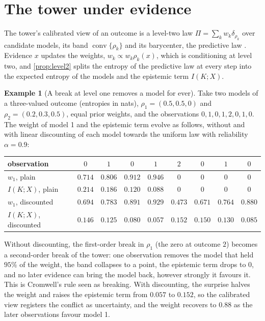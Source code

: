 \documentclass[11pt]{article}
\theoremstyle{definition}
\newtheorem{example}[theorem]{Example}
\theoremstyle{remark}
\begin{document}
\section{The tower under evidence}\label{sec:towerdyn}

The tower's calibrated view of an outcome is a level-two law $\Pi=\sum_kw_k\delta_{\rho_k}$ over candidate models, its band
$\operatorname{conv}\{\rho_k\}$ and its barycenter, the predictive law \cite{Tower}. Evidence $x$ updates the weights,
$w_k\propto w_k\rho_k(x)$, which is conditioning at level two, and \cref{prop:level2} splits the entropy of the predictive law at every
step into the expected entropy of the models and the epistemic term $I(K;X)$.

\begin{example}[A break at level one removes a model for ever]\label{ex:cromwell}
Take two models of a three-valued outcome (entropies in nats), $\rho_1=(0.5,0.5,0)$ and $\rho_2=(0.2,0.3,0.5)$, equal prior weights, and the observations
$0,1,0,1,2,0,1,0$. The weight of model 1 and the epistemic term evolve as follows, without and with linear discounting of each model towards the
uniform law with reliability $\alpha=0.9$:
\begin{center}
\begin{tabular}{lcccccccc}
\toprule
observation & $0$ & $1$ & $0$ & $1$ & $2$ & $0$ & $1$ & $0$\\
\midrule
$w_1$, plain & $0.714$ & $0.806$ & $0.912$ & $0.946$ & $0$ & $0$ & $0$ & $0$\\
$I(K;X)$, plain & $0.214$ & $0.186$ & $0.120$ & $0.088$ & $0$ & $0$ & $0$ & $0$\\
$w_1$, discounted & $0.694$ & $0.783$ & $0.891$ & $0.929$ & $0.473$ & $0.671$ & $0.764$ & $0.880$\\
$I(K;X)$, discounted & $0.146$ & $0.125$ & $0.080$ & $0.057$ & $0.152$ & $0.150$ & $0.130$ & $0.085$\\
\bottomrule
\end{tabular}
\end{center}
Without discounting, the first-order break in $\rho_1$ (the zero at outcome $2$) becomes a second-order break of the tower: one
observation removes the model that held $95\%$ of the weight, the band collapses to a point, the epistemic term drops to $0$, and no
later evidence can bring the model back, however strongly it favours it. This is Cromwell's rule seen as breaking. With discounting, the
surprise halves the weight and raises the epistemic term from $0.057$ to $0.152$, so the calibrated view registers the conflict as
uncertainty, and the weight recovers to $0.88$ as the later observations favour model 1.
\end{example}
\end{document}
